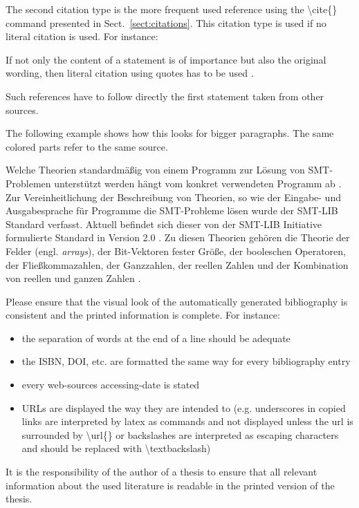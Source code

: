 The second citation type is the more frequent used reference using the \textbackslash cite\{\} command presented in Sect.~\ref{sect:citations}.
This citation type is used if no literal citation is used.
For instance:
\begin{center}
If not only the content of a statement is of importance but also the original wording, then literal citation using quotes has to be used \cite{wikicite}.
\end{center}
Such references have to follow directly the first statement taken from other sources.

The following example shows how this looks for bigger paragraphs.
The same colored parts refer to the same source.

\begin{flushleft}
\textcolor[rgb]{1,0,0}{Welche Theorien standardmäßig von einem Programm zur Lösung von SMT-Problemen unterstützt werden hängt vom konkret verwendeten Programm ab \cite{smtappetizer}.
Zur Vereinheitlichung der Beschreibung von Theorien, so wie der Eingabe- und Ausgabesprache für Programme die SMT-Probleme lösen wurde der SMT-LIB Standard verfasst.}
\textcolor[rgb]{0.2,0.8,0.2}{Aktuell befindet sich dieser von der SMT-LIB Initiative formulierte Standard in Version 2.0 \cite{smtlib}.}
\textcolor[rgb]{0,0.8,1}{Zu diesen Theorien gehören die Theorie der Felder (engl. \textit{arrays}), der Bit-Vektoren fester Größe, der booleschen Operatoren, der Fließkommazahlen, der Ganzzahlen, der reellen Zahlen und der Kombination von reellen und ganzen Zahlen \cite{smtlibweb}.}
\end{flushleft}

Please ensure that the visual look of the automatically generated bibliography is consistent and the printed information is complete.
For instance:
\begin{itemize}
	\item the separation of words at the end of a line should be adequate
	\item the ISBN, DOI, etc. are formatted the same way for every bibliography entry
	\item every web-sources accessing-date is stated
	\item URLs are displayed the way they are intended to (e.g. underscores in copied links are interpreted by latex as commands and not displayed unless the url is surrounded by \textbackslash url\{\} or backslashes are interpreted as escaping characters and should be replaced with \textbackslash textbackslash)
\end{itemize}
It is the responsibility of the author of a thesis to ensure that all relevant information about the used literature is readable in the printed version of the thesis.

